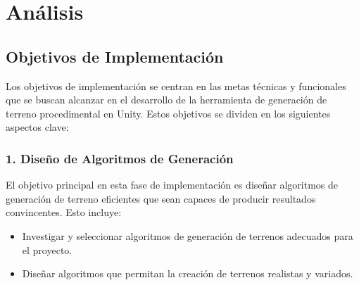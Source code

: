 




\section{Análisis}

\subsection{Objetivos de Implementación}

Los objetivos de implementación se centran en las metas técnicas y funcionales que se buscan alcanzar en el desarrollo de la herramienta de generación de terreno procedimental en Unity. Estos objetivos se dividen en los siguientes aspectos clave:

\subsubsection{1. Diseño de Algoritmos de Generación}

El objetivo principal en esta fase de implementación es diseñar algoritmos de generación de terreno eficientes que sean capaces de producir resultados convincentes. Esto incluye:

\begin{itemize}
    \item Investigar y seleccionar algoritmos de generación de terrenos adecuados para el proyecto.
    \item Diseñar algoritmos que permitan la creación de terrenos realistas y variados.
\end{itemize}

